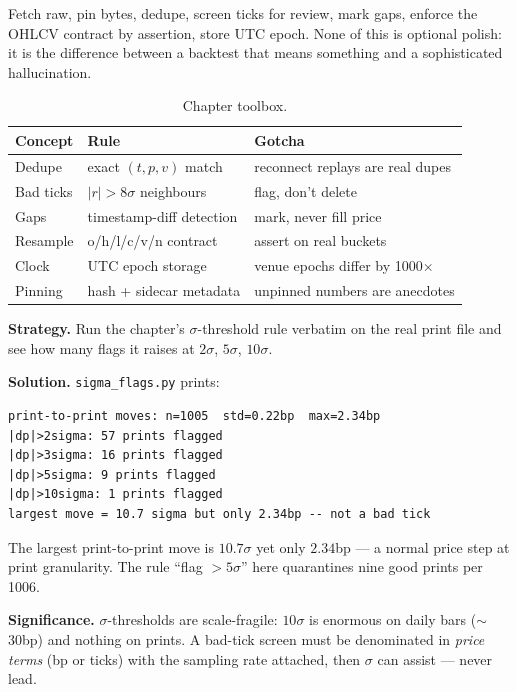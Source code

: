 Fetch raw, pin bytes, dedupe, screen ticks for review, mark gaps, enforce the OHLCV contract
by assertion, store UTC epoch. None of this is optional polish: it is the difference between
a backtest that means something and a sophisticated hallucination.

\begin{table}[htbp]\centering\small
\caption{Chapter toolbox.}
\begin{tabular}{@{}lll@{}}
\toprule
Concept & Rule & Gotcha\\
\midrule
Dedupe & exact $(t,p,v)$ match & reconnect replays are real dupes\\
Bad ticks & $|r|>8\sigma$ neighbours & flag, don't delete\\
Gaps & timestamp-diff detection & mark, never fill price\\
Resample & o/h/l/c/v/n contract & assert on real buckets\\
Clock & UTC epoch storage & venue epochs differ by 1000$\times$\\
Pinning & hash + sidecar metadata & unpinned numbers are anecdotes\\
\bottomrule
\end{tabular}
\end{table}

\begin{example}\label{ex:sigmaflag}
\textbf{Strategy.} Run the chapter's $\sigma$-threshold rule
verbatim on the real print file and see how many flags it raises
at $2\sigma$, $5\sigma$, $10\sigma$.

\textbf{Solution.} \texttt{sigma\_flags.py} prints:
\begin{verbatim}
print-to-print moves: n=1005  std=0.22bp  max=2.34bp
|dp|>2sigma: 57 prints flagged
|dp|>3sigma: 16 prints flagged
|dp|>5sigma: 9 prints flagged
|dp|>10sigma: 1 prints flagged
largest move = 10.7 sigma but only 2.34bp -- not a bad tick
\end{verbatim}
The largest print-to-print move is $10.7\sigma$ yet only
$2.34$bp --- a normal price step at print granularity. The rule
``flag $>5\sigma$'' here quarantines nine good prints per 1006.

\textbf{Significance.} $\sigma$-thresholds are scale-fragile:
$10\sigma$ is enormous on daily bars ($\sim$30bp) and nothing on
prints. A bad-tick screen must be denominated in \emph{price
terms} (bp or ticks) with the sampling rate attached, then
$\sigma$ can assist --- never lead.
\end{example}

